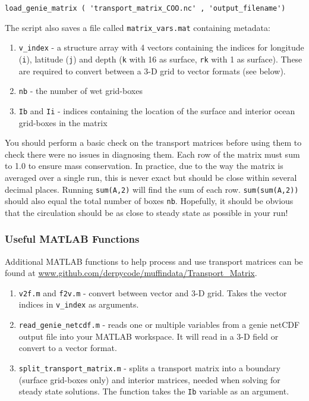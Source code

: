 \documentclass[11pt,fleqn]{book} %
\begin{document}
\begin{verbatim}
load_genie_matrix ( 'transport_matrix_COO.nc' , 'output_filename')
\end{verbatim}

\noindent The script also saves a file called \texttt{matrix\_vars.mat} containing metadata:

\vspace{2mm}
\begin{enumerate}
\item \texttt{v\_index} - a structure array with 4 vectors containing the indices for longitude (\texttt{i}), latitude (\texttt{j}) and depth (\texttt{k} with 16 as surface, \texttt{rk} with 1 as surface). These are required to convert between a 3-D grid to vector formats (see below).
\item \texttt{nb} - the number of wet grid-boxes
\item \texttt{Ib} and \texttt{Ii} - indices containing the location of the surface and interior ocean grid-boxes in the matrix
\end{enumerate}
\vspace{2mm}

You should perform a basic check on the transport matrices before using them to check there were no issues in diagnosing them. Each row of the matrix must sum to 1.0 to ensure mass conservation. In practice, due to the way the matrix is averaged over a single run, this is never exact but should be close within several decimal places. Running \texttt{sum(A,2)} will find the sum of each row. \texttt{sum(sum(A,2))} should also equal the total number of boxes \texttt{nb}. Hopefully, it should be obvious that the circulation should be as close to steady state as possible in your run!

%
\subsubsection{Useful MATLAB Functions}
\vspace{1mm}

Additional MATLAB functions to help process and use transport matrices can be found at \url{www.github.com/derpycode/muffindata/Transport_Matrix}.

\vspace{2mm}
\begin{enumerate}
\item \texttt{v2f.m} and \texttt{f2v.m} - convert between vector and 3-D grid. Takes the vector indices in \texttt{v\_index} as arguments.
\item \texttt{read\_genie\_netcdf.m} - reads one or multiple variables from a genie netCDF output file into your MATLAB workspace. It will read in a 3-D field or convert to a vector format.
\item \texttt{split\_transport\_matrix.m} - splits a transport matrix into a boundary (surface grid-boxes only) and interior matrices, needed when solving for steady state solutions. The function takes the \texttt{Ib} variable as an argument.
\end{enumerate}
\vspace{2mm}
\end{document}
